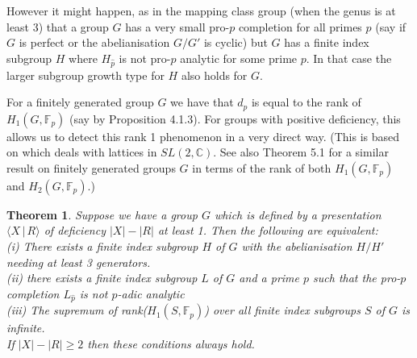 \documentclass[11pt,reqno]{amsart}
\numberwithin{equation}{section}
\newcommand{\Cc}{\mathbb{C}}
\newcommand{\F}{\mathbb{F}}
\newtheorem{thm}{Theorem}[section]
\theoremstyle{definition}
\theoremstyle{remark}
\begin{document}
     However it might happen, as in the mapping class group
     (when the genus is at least 3) that a group $G$ has a very small
     pro-$p$ completion for all primes $p$ (say if $G$ is perfect or
     the abelianisation $G/G'$ is cyclic) but $G$ has a finite index subgroup
     $H$ where $H_{\hat{p}}$ is not pro-$p$ analytic for some prime $p$. In
     that case the larger subgroup growth type for $H$ also holds for $G$.
     
     

     For a finitely generated group $G$ we have that $d_p$ is equal to the
     rank of $H_1(G,\F_p)$ (say by \cite{gz2} Proposition 4.1.3). For
     groups with positive deficiency, this allows us to detect this
     rank 1 phenomenon in a very direct way.  (This is based
     on \cite{lbsgcg} which deals with lattices in $SL(2,\Cc)$.
     See also \cite{lac} Theorem 5.1 for a similar result on
     finitely generated groups $G$ in terms of the rank of both
     $H_1(G,\F_p)$ and $H_2(G,\F_p)$.)
     \begin{thm} \label{padan}
       Suppose  we have a group $G$
       which is defined by a presentation $\langle X\,|\,R\rangle$
       of deficiency $|X|-|R|$ at least 1. Then the following are
       equivalent:\\
              (i) There exists a finite index subgroup $H$ of $G$ with
       the abelianisation $H/H'$ needing at least 3 generators.\\
       (ii) there exists a finite
       index subgroup $L$ of $G$ and a prime $p$ such that the pro-$p$
       completion $L_{\hat{p}}$ is not $p$-adic analytic\\
       (iii) The supremum of rank($H_1(S,\F_p)$) over all finite index subgroups
       $S$ of $G$ is infinite.\\
       If $|X|-|R|\geq 2$ then these conditions always hold.
\end{thm}
\end{document}
